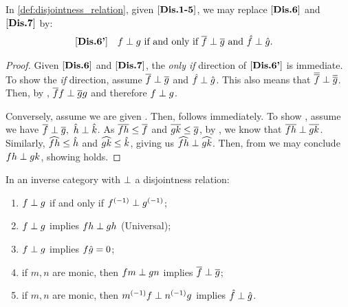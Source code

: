 \begin{lemma}\label{lem:disjointness_equivalent_axioms}
  In \ref{def:disjointness_relation}, given $[\text{\bfseries {Dis}.{1-5}}]$, we may
  replace $[\text{\bfseries {Dis}.{6}}]$ and $[\text{\bfseries {Dis}.{7}}]$ by:
  \begin{align*}
    [\text{\bfseries {Dis}.{6'}}]\quad &f\perp g\text{ if and only if }\overline{f} \perp \overline{g}
      \text{ and }\hat{f}\perp\hat{g}.
  \end{align*}
\end{lemma}
\begin{proof}
  Given $[\text{\bfseries {Dis}.{6}}]$ and $[\text{\bfseries {Dis}.{7}}]$, the \emph{only if} direction of $[\text{\bfseries {Dis}.{6'}}]$ is
  immediate. To show the \emph{if} direction, assume $\overline{f} \perp \overline{g}$ and
  $\hat{f}\perp\hat{g}$. This also means that $\overline{\overline{f}} \perp \overline{\overline{g}}$. Then, by
  , $\overline{f} f \perp \overline{g}g$ and therefore $f \perp g$.

  Conversely, assume we are given . Then,  follows immediately. To show
  , assume we have $\rst{f}\cdperp \rst{g},\ \rg{h}\cdperp \rg{k}$. As
  $\overline{f h} \le \overline{f}$ and $\overline{g k}\le\overline{g}$, by , we know that
  $\overline{f h} \perp \overline{g k}$. Similarly, $\widehat{f h} \le \hat{h}$ and $\widehat{g k} \le \hat{k}$,
  giving us $\widehat{f h}\perp \widehat{g k}$. Then, from  we may conclude
  $f h \perp g k$, showing  holds.
\end{proof}
\begin{lemma}\label{lem:disjointness_various}
  In an inverse category \X with $\perp$ a disjointness relation:
  \begin{enumerate}[{(}i{)}]
    \item $f \perp g$ if and only if ${f}^{(-1)}\perp {g}^{(-1)}$; \label{lemitem:djv_inverses}
    \item $f \perp g$ implies $f h \perp g h$ (Universal);\label{lemitem:djv_universal}
    \item $f \perp g$ implies $f\hat{g} = 0$; \label{lemitem:djv_disjoint_composition_is_0}
    \item if $m,n$ are monic, then $f m \perp g n$ implies $\overline{f} \perp \overline{g}$;
      \label{lemitem:djv_monic_implies}
    \item if $m,n$ are monic, then ${m}^{(-1)} f \perp {n}^{(-1)}g$ implies $\hat{f} \perp \hat{g}$.
      \label{lemitem:djv_inv_monic_implies}
  \end{enumerate}
\end{lemma}

